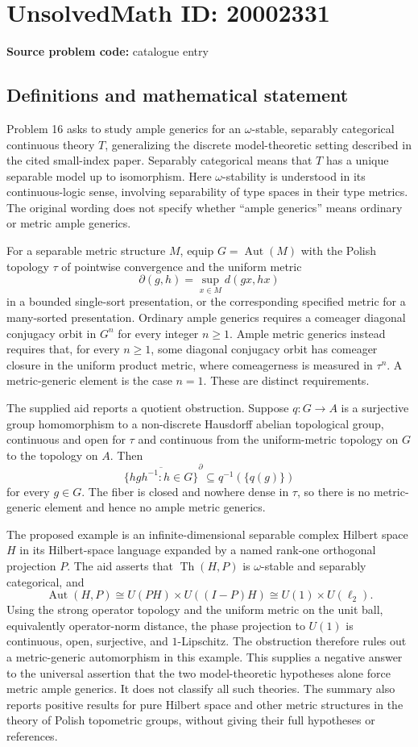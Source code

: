 \documentclass[11pt]{article}
\begin{document}
\section*{UnsolvedMath ID: 20002331}
\textbf{Source problem code:} catalogue entry
\subsection{Definitions and mathematical statement}
Problem 16 asks to study ample generics for an $\omega$-stable, separably categorical continuous theory $T$, generalizing the discrete model-theoretic setting described in the cited small-index paper. Separably categorical means that $T$ has a unique separable model up to isomorphism. Here $\omega$-stability is understood in its continuous-logic sense, involving separability of type spaces in their type metrics. The original wording does not specify whether ``ample generics'' means ordinary or metric ample generics.

For a separable metric structure $M$, equip $G=\operatorname{Aut}(M)$ with the Polish topology $\tau$ of pointwise convergence and the uniform metric
\[
\partial(g,h)=\sup_{x\in M}d(gx,hx)
\]
in a bounded single-sort presentation, or the corresponding specified metric for a many-sorted presentation. Ordinary ample generics requires a comeager diagonal conjugacy orbit in $G^n$ for every integer $n\geq1$. Ample metric generics instead requires that, for every $n\geq1$, some diagonal conjugacy orbit has comeager closure in the uniform product metric, where comeagerness is measured in $\tau^n$. A metric-generic element is the case $n=1$. These are distinct requirements.

The supplied aid reports a quotient obstruction. Suppose $q:G\to A$ is a surjective group homomorphism to a non-discrete Hausdorff abelian topological group, continuous and open for $\tau$ and continuous from the uniform-metric topology on $G$ to the topology on $A$. Then
\[
\overline{\{hgh^{-1}:h\in G\}}^{\partial}\subseteq q^{-1}(\{q(g)\})
\]
for every $g\in G$. The fiber is closed and nowhere dense in $\tau$, so there is no metric-generic element and hence no ample metric generics.

The proposed example is an infinite-dimensional separable complex Hilbert space $H$ in its Hilbert-space language expanded by a named rank-one orthogonal projection $P$. The aid asserts that $\operatorname{Th}(H,P)$ is $\omega$-stable and separably categorical, and
\[
\operatorname{Aut}(H,P)\cong U(PH)\times U((I-P)H)\cong U(1)\times U(\ell_2).
\]
Using the strong operator topology and the uniform metric on the unit ball, equivalently operator-norm distance, the phase projection to $U(1)$ is continuous, open, surjective, and $1$-Lipschitz. The obstruction therefore rules out a metric-generic automorphism in this example. This supplies a negative answer to the universal assertion that the two model-theoretic hypotheses alone force metric ample generics. It does not classify all such theories. The summary also reports positive results for pure Hilbert space and other metric structures in the theory of Polish topometric groups, without giving their full hypotheses or references.
\end{document}
